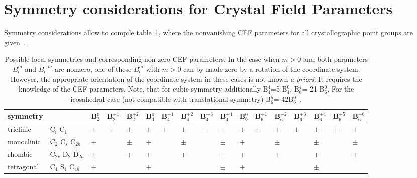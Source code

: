 \section{Symmetry considerations for Crystal Field Parameters}

Symmetry considerations allow to compile 
table~\ref{tab:symmetry}, where the nonvanishing
CEF parameters for all 
crystallographic point groups are
given~\cite{bauer09-183}.

\begin{landscape}

\begin{table}
\caption{Possible local symmetries and corresponding non zero CEF parameters.
  In the case when $m>0$ and both parameters $B_l^m$ and $B_l^{-m}$ are
nonzero, one of these $B_l^m$ with $m>0$
 can by made zero by a rotation of the coordinate system.
However, the appropriate orientation of 
the coordinate system in these cases is not known {\em a priori}. It requires
the knowledge of the CEF parameters.
Note, that for cubic symmetry additionally B$_4^4$=5 B$_4^0$,
B$_6^4$=-21 B$_6^0$. For the icosahedral case (not compatible with
translational symmetry) B$_6^5$=-42B$_6^0$~\cite{walter87-2504}.}
\label{tab:symmetry}
\begin{tabular}{lllllllllllllllll}
\hline
symmetry   &                                    &B$_2^0$&B$_2^{\pm 1}$&B$_2^{\pm 2}$&B$_4^0$&B$_4^{\pm 1}$&B$_4^{\pm 2}$&B$_4^{\pm 3}$&B$_4^{\pm 4}$&B$_6^0$&B$_6^{\pm 1}$&B$_6^{\pm 2}$&B$_6^{\pm 3}$&B$_6^{\pm 4}$&B$_6^{\pm 5}$&B$_6^{\pm 6}$\\
\hline
triclinic  & C$_i$ C$_1$                        &+      &$\pm$  &$\pm$&+     &$\pm$  &$\pm$  &$\pm$  &$\pm$  &+      &$\pm$  &$\pm$ &$\pm$&$\pm$  &$\pm$  &$\pm$  \\
monoclinic & C$_2$ C$_s$ C$_{2h}$               &+      &       &$\pm$ &+      &       &$\pm$  &       &$\pm$  &+      &       &$\pm$  & &$\pm$  &       &$\pm$  \\
rhombic    & C$_{2v}$ D$_{2}$ D$_{2h}$          &+      &       &+ &+      &       &+      &       &+      &+      &       &+      & &+      &       &+      \\
tetragonal & C$_{4}$ S$_{4}$ C$_{4h}$           &+      &       & &+      &       &       &       &$\pm$  &+      &       &       & &$\pm$  &       &       \\

\end{tabular}
\end{table}
\end{landscape}
